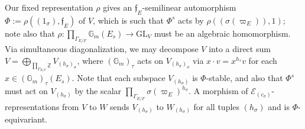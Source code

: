 \documentclass[11pt]{amsart}
\theoremstyle{definition}
\newcommand{\mc}{\mathcal}
\newcommand{\mf}{\mathfrak}
\begin{document}
Our fixed representation $\rho$ gives an $\mf{f}_{E}$-semilinear automorphism $\Phi := \rho((1_{\sigma}), \mf{f}_{E})$ of $V$, which is such that $\Phi^{s}$ acts by $\rho((\sigma(\varpi_{E})), 1)$; note also that $\rho \colon \prod_{\Gamma_{E/F}} \mathbb{G}_{m}(E_{s}) \to \mathrm{GL}_{V}$ must be an algebraic homomorphism. Via simultaneous diagonalization, we may decompose $V$ into a direct sum $V = \bigoplus\limits_{\prod_{\Gamma_{E/F}} \mathbb{Z}} V_{(h_{\sigma})_{\sigma}}$, where $(\mathbb{G}_{m})_{\tau}$ acts on $V_{(h_{\sigma})_{\sigma}}$ via $x \cdot v = x^{h_{\tau}}v$ for each $x \in (\mathbb{G}_{m})_{\tau}(E_{s})$. Note that each subspace $V_{(h_{\sigma})}$ is $\Phi$-stable, and also that $\Phi^{s}$ must act on $V_{(h_{\sigma})}$ by the scalar $\prod_{\Gamma_{E/F}} \sigma(\varpi_{E})^{h_{\sigma}}$. A morphism of $\mc{E}_{(c_{\sigma})}$-representations from $V$ to $W$ sends $V_{(h_{\sigma})}$ to $W_{(h_{\sigma})}$ for all tuples $(h_{\sigma})$ and is $\Phi$-equivariant.
\end{document}
